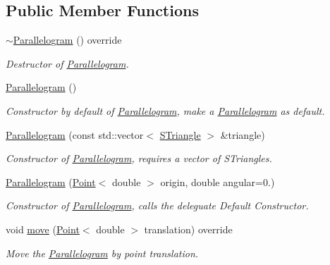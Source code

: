 \subsection*{Public Member Functions}
\begin{DoxyCompactItemize}
\item 
\mbox{\label{classParallelogram_ae3c14e58b92406f4679234817313a26c}} 
\hyperlink{classParallelogram_ae3c14e58b92406f4679234817313a26c}{$\sim$\+Parallelogram} () override
\begin{DoxyCompactList}\small\item\em Destructor of \hyperlink{classParallelogram}{Parallelogram}. \end{DoxyCompactList}\item 
\mbox{\label{classParallelogram_a42d1890b0805548b554abfcc90214f02}} 
\hyperlink{classParallelogram_a42d1890b0805548b554abfcc90214f02}{Parallelogram} ()
\begin{DoxyCompactList}\small\item\em Constructor by default of \hyperlink{classParallelogram}{Parallelogram}, make a \hyperlink{classParallelogram}{Parallelogram} as default. \end{DoxyCompactList}\item 
\hyperlink{classParallelogram_ac028ca113b67af9295c474a93bc13b86}{Parallelogram} (const std\+::vector$<$ \hyperlink{classSTriangle}{S\+Triangle} $>$ \&triangle)
\begin{DoxyCompactList}\small\item\em Constructor of \hyperlink{classParallelogram}{Parallelogram}, requires a vector of S\+Triangles. \end{DoxyCompactList}\item 
\hyperlink{classParallelogram_afe4d20e613d01f409788d1875afcd8a8}{Parallelogram} (\hyperlink{classPoint}{Point}$<$ double $>$ origin, double angular=0.)
\begin{DoxyCompactList}\small\item\em Constructor of \hyperlink{classParallelogram}{Parallelogram}, calls the deleguate Default Constructor. \end{DoxyCompactList}\item 
void \hyperlink{classParallelogram_a982287c8d16ec47951db62b07eb77feb}{move} (\hyperlink{classPoint}{Point}$<$ double $>$ translation) override
\begin{DoxyCompactList}\small\item\em Move the \hyperlink{classParallelogram}{Parallelogram} by point translation. \end{DoxyCompactList}\item 

\end{DoxyCompactItemize}
